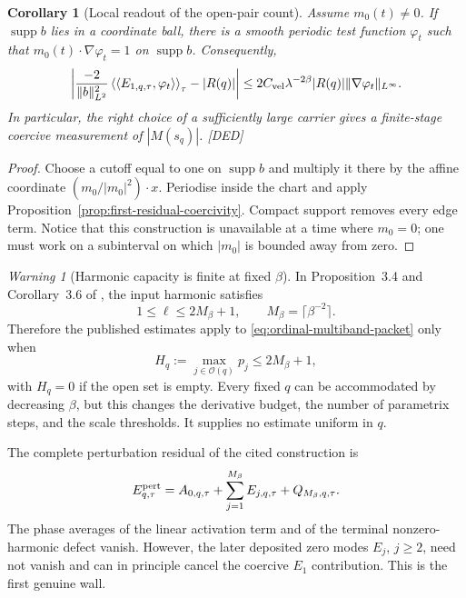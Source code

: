 \documentclass[11pt]{amsart}
\numberwithin{equation}{section}
\theoremstyle{plain}
\newtheorem{corollary}[theorem]{Corollary}
\theoremstyle{definition}
\theoremstyle{remark}
\newtheorem{warning}[theorem]{Warning}
\begin{document}
\begin{corollary}[Local readout of the open-pair count]
\label{cor:local-open-pair-readout}
Assume $m_0(t)\ne0$.  If $\operatorname{supp}b$ lies in a coordinate ball,
there is a smooth periodic test function $\varphi_t$ such that
$m_0(t)\cdot\nabla\varphi_t=1$ on $\operatorname{supp}b$.  Consequently,
\begin{equation}
 \left|
 \frac{-2}{\|b\|_{L^2}^2}
 \left\langle\left\langle E_{1,q,\tau},\varphi_t\right\rangle
 \right\rangle_\tau-|R(q)|
 \right|
 \le 2C_{\rm vel}\lambda^{-2\beta}|R(q)|
       \|\nabla\varphi_t\|_{L^\infty}.
\label{eq:normalised-E1-readout}
\end{equation}
In particular, the right choice of a sufficiently large carrier gives a
finite-stage coercive measurement of $|M(s_q)|$.  \textup{[DED]}
\end{corollary}

\begin{proof}
Choose a cutoff equal to one on $\operatorname{supp}b$ and multiply it there
by the affine coordinate $(m_0/|m_0|^2)\cdot x$.  Periodise inside the chart
and apply Proposition~\ref{prop:first-residual-coercivity}.  Compact support
removes every edge term.  Notice that this construction is unavailable at a
time where $m_0=0$; one must work on a subinterval on which $|m_0|$ is bounded
away from zero.
\end{proof}

\begin{warning}[Harmonic capacity is finite at fixed $\beta$]
\label{warn:harmonic-capacity}
In Proposition~3.4 and Corollary~3.6 of
\cite{AlpogeBuckmasterCoiculescu2026}, the input harmonic satisfies
\begin{equation}
 1\le\ell\le2M_\beta+1,
 \qquad M_\beta=\lceil\beta^{-2}\rceil.
\label{eq:harmonic-capacity}
\end{equation}
Therefore the published estimates apply to
\eqref{eq:ordinal-multiband-packet} only when
\begin{equation}
 H_q:=\max_{j\in\mathcal O(q)}p_j\le2M_\beta+1,
\label{eq:prime-capacity-condition}
\end{equation}
with $H_q=0$ if the open set is empty.  Every fixed $q$ can be accommodated
by decreasing $\beta$, but this changes the derivative budget, the number of
parametrix steps, and the scale thresholds.  It supplies no estimate uniform
in $q$.
\end{warning}

The complete perturbation residual of the cited construction is
\begin{equation}
 E^{\rm pert}_{q,\tau}=A_{0,q,\tau}
   +\sum_{j=1}^{M_\beta}E_{j,q,\tau}+Q_{M_\beta,q,\tau}.
\label{eq:full-perturbation-residual-zero-route}
\end{equation}
The phase averages of the linear activation term and of the terminal
nonzero-harmonic defect vanish.  However, the later deposited zero modes
$E_j$, $j\ge2$, need not vanish and can in principle cancel the coercive
$E_1$ contribution.  This is the first genuine wall.
\end{document}
